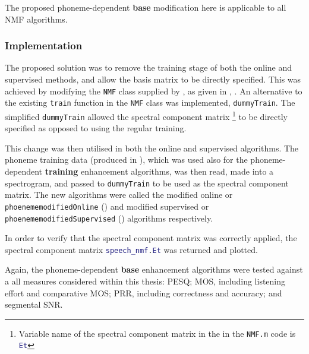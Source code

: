 The proposed phoneme-dependent\textbf{ base} modification here is
applicable to all \ac{NMF} algorithms.


\subsubsection*{Implementation}

The proposed solution was to remove the training stage of both the
online and supervised methods, and allow the basis matrix to be directly
specified. This was achieved by modifying the \lstinline[language=bash]!NMF!
class supplied by \citet{mohammadiha2013supervised}, as given in
, \textit{}. An alternative
to the existing \lstinline[language=bash]!train! function in the
\lstinline[language=bash]!NMF! class was implemented, \lstinline[language=bash]!dummyTrain!.
The simplified \lstinline[language=bash]!dummyTrain! allowed the
spectral component matrix%
\footnote{Variable name of the spectral component matrix in the in the \lstinline[language=bash]!NMF.m!
code is \lstinline[language=Matlab]!Et!%
} to be directly specified as opposed to using the regular training.

This change was then utilised in both the online and supervised algorithms.
The phoneme training data (produced in ),
which was used also for the phoneme-dependent\textbf{ training} enhancement
algorithms, was then read, made into a spectrogram, and passed to
\lstinline[language=bash]!dummyTrain! to be used as the spectral
component matrix. The new algorithms were called the modified online
or \lstinline[language=bash]!phoenememodifiedOnline! ()
and modified supervised or \lstinline[language=bash]!phoenememodifiedSupervised!
() algorithms respectively.

In order to verify that the spectral component matrix was correctly
applied, the spectral component matrix \lstinline[language=Matlab]!speech_nmf.Et!
was returned and plotted.

Again, the phoneme-dependent\textbf{ base} enhancement algorithms
were tested against a all measures considered within this thesis:
\ac{PESQ}; \ac{MOS}, including listening effort and comparative
\ac{MOS}; \ac{PRR}, including correctness and accuracy; and segmental
\ac{SNR}.

